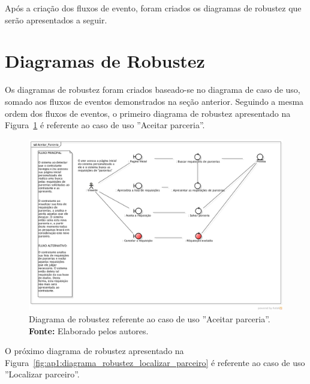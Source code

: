 Após a criação dos fluxos de evento, foram criados os diagramas de robustez que serão apresentados a seguir.

\section*{Diagramas de Robustez}

Os diagramas de robustez foram criados baseado-se no diagrama de caso de uso, somado aos fluxos de eventos demonstrados na seção anterior. Seguindo a mesma ordem dos fluxos de eventos, o primeiro diagrama de robustez apresentado na Figura~\ref{fig:ap1:diagrama_robustez_aceitar_parceria} é referente ao caso de uso ''Aceitar parceria''.

\newpage
\captionsetup[figure]{list=no}
\begin{figure}[h!]
	\centerline{\includegraphics[scale=0.4]{./imagens/apendices/diagrama-robustez-aceitar-parceria.png}}
	\caption[Diagrama de robustez referente ao caso de uso ''Aceitar parceria''.]
	{Diagrama de robustez referente ao caso de uso ''Aceitar parceria''. \textbf{Fonte:} Elaborado pelos autores.}
	\label{fig:ap1:diagrama_robustez_aceitar_parceria}
\end{figure}

O próximo diagrama de robustez apresentado na Figura~\ref{fig:ap1:diagrama_robustez_localizar_parceiro} é referente ao caso de uso ''Localizar parceiro''.

